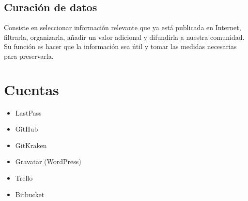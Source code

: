 \documentclass[12pt,letterpaper]{article}
\begin{document}
\subsection*{Curación de datos}
Consiste en seleccionar informaci\'on relevante que ya está publicada en Internet, filtrarla, organizarla, añadir un valor adicional y difundirla a nuestra comunidad.
\citep{DuroCur}
Su función es hacer que la información sea útil y tomar las medidas necesarias para preservarla.
\citep{ItCur}

\section{Cuentas}
\begin{itemize}
\item LastPass
\item GitHub
\item GitKraken
\item Gravatar (WordPress)
\item Trello
\item Bitbucket
\end{itemize}

 

\end{document}
